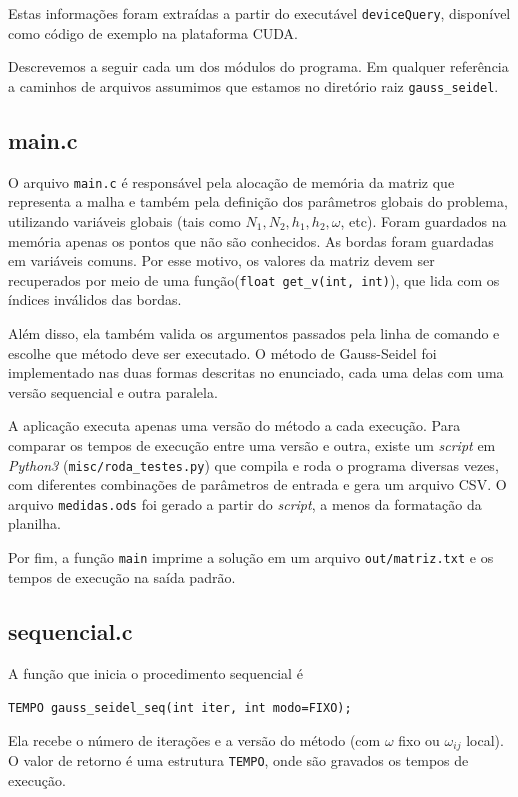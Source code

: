 \documentclass[a4paper,landscape,11pt]{article}
\begin{document}
Estas informações foram extraídas a partir do executável \texttt{deviceQuery}, disponível como código de exemplo na plataforma CUDA.

Descrevemos a seguir cada um dos módulos do programa. Em qualquer referência a caminhos de arquivos assumimos que estamos no diretório raiz \texttt{gauss\_seidel}.

\subsection{main.c}
O arquivo \texttt{main.c} é responsável pela alocação de memória da matriz que representa a malha e também pela definição dos parâmetros globais do problema, utilizando variáveis globais (tais como $N_1,N_2,h_1,h_2,\omega$, etc). Foram guardados na memória apenas os pontos que não são conhecidos. As bordas foram guardadas em variáveis comuns. Por esse motivo, os valores da matriz devem ser recuperados por meio de uma função(\texttt{float get\_v(int, int)}), que lida com os índices inválidos das bordas.

Além disso, ela também valida os argumentos passados pela linha de comando e escolhe que método deve ser executado. O método de Gauss-Seidel foi implementado nas duas formas descritas no enunciado, cada uma delas com uma versão sequencial e outra paralela.

A aplicação executa apenas uma versão do método a cada execução. Para comparar os tempos de execução entre uma versão e outra, existe um \textit{script} em \textit{Python3} (\texttt{misc/roda\_testes.py}) que compila e roda o programa diversas vezes, com diferentes combinações de parâmetros de entrada e gera um arquivo CSV. O arquivo \texttt{medidas.ods} foi gerado a partir do \textit{script}, a menos da formatação da planilha.

Por fim, a função \texttt{main} imprime a solução em um arquivo \texttt{out/matriz.txt} e os tempos de execução na saída padrão.

\subsection{sequencial.c}

A função que inicia o procedimento sequencial é

\texttt{TEMPO gauss\_seidel\_seq(int iter, int modo=FIXO);}

Ela recebe o número de iterações e a versão do método (com $\omega$ fixo ou $\omega_{ij}$ local). O valor de retorno é uma estrutura \texttt{TEMPO}, onde são gravados os tempos de execução.
\end{document}
